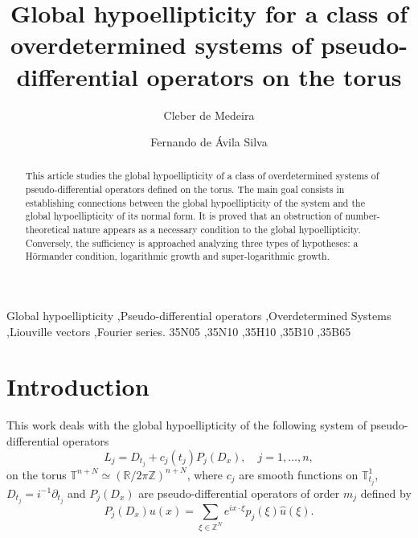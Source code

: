 \documentclass[12pt]{elsarticle}
\numberwithin{equation}{section}
\begin{document}
\begin{frontmatter}

\title{Global  hypoellipticity  for a class of overdetermined systems of pseudo-differential operators on the torus}






\author[addressUFPR]{Cleber de Medeira }

\author[addressUFPR]{Fernando de \'Avila Silva}


\address[addressUFPR]{Department of Mathematics, Federal University of Paran\'a, Caixa Postal 19081, \\ CEP 81531-980, Curitiba, Brazil}

\begin{abstract}
This article studies the  global hypoellipticity 
of a class of overdetermined systems of pseudo-differential operators defined on the torus. The main goal consists in establishing  connections between the global hypoellipticity of the system and the  global hypoellipticity of its normal form. It is proved that an  obstruc\-tion of number-theoretical nature appears as a necessary condition to the  global hypoellipticity. Conversely, the  sufficiency is approached ana\-lyzing  three types of hypotheses: a H\"{o}rmander condition, logarithmic growth and super-logarithmic growth. 
\end{abstract}

\begin{keyword}
Global hypoellipticity \sep Pseudo-differential operators \sep Overdetermined Systems \sep Liouville vectors \sep Fourier series.
\MSC[2020] 35N05 \sep 35N10 \sep  35H10  \sep 35B10 \sep 35B65
\end{keyword}



\end{frontmatter}


\tableofcontents

\section{Introduction}

This work deals with the global hypoellipticity of the following system of   pseudo-differential operators 
\begin{equation}\label{system}
L_j = D_{t_j} + c_j(t_j) P_j(D_x),\quad   j=1,\ldots,n,
\end{equation}
on the torus $\mathbb{T}^{n+N} \simeq (\mathbb{R}/2\pi\mathbb{Z})^{n+N}$, 
where  $c_j$ are smooth functions on $\mathbb{T}_{t_j}^{1}$, $ D_{t_j}={i}^{-1}{\partial_{t_j}}$ and $P_j(D_x)$ are pseudo-differential operators of order $m_j$
defined by 
\begin{equation}\label{pdo}
P_j(D_x)  u(x) = \sum_{\xi \in \mathbb{Z}^N}{e^{i x \cdot \xi} p_j(\xi) \widehat{u}(\xi)}.
\end{equation}
\end{document}

